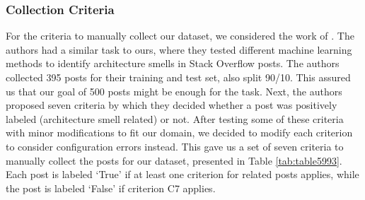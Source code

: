\documentclass[english,bachelor]{swsLeipzig}
\begin{document}
\subsubsection{Collection Criteria}
For the criteria to manually collect our dataset, we considered the work of \citet{tian:2020}. The authors had a similar 
task to ours, where they tested different machine learning methods to identify architecture smells in Stack Overflow posts. The authors collected 395 posts for their training and test set, also split 90/10. This assured us that our goal of 500 posts might be enough for the task. Next, the authors proposed seven criteria by which they decided whether a post was positively labeled (architecture smell related) or not. After testing some of these criteria with minor modifications to fit our domain, we decided to modify each criterion to consider configuration errors instead. This gave us a set of seven criteria to manually collect the posts for our dataset, presented in Table \ref{tab:table5993}. Each post is labeled `True' if at least one criterion for related posts applies, while the post is labeled `False' if criterion C7 applies.
\end{document}
